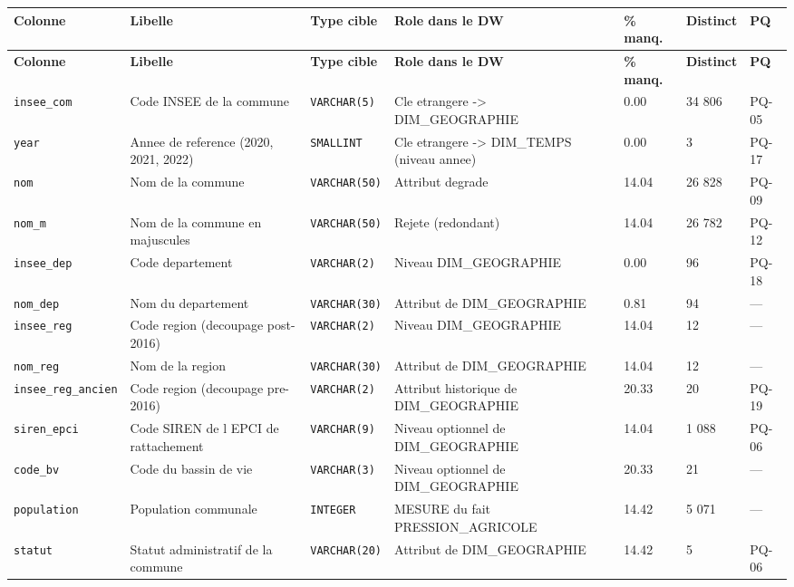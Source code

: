 {\footnotesize\setlength{\tabcolsep}{3pt}
\begin{longtable}{@{}p{2.6cm}p{3.5cm}p{1.9cm}p{3.1cm}p{1.1cm}p{1.3cm}p{0.9cm}@{}}
\toprule
\textbf{Colonne} & \textbf{Libelle} & \textbf{Type cible} & \textbf{Role dans le DW} & \textbf{\% manq.} & \textbf{Distinct} & \textbf{PQ} \\
\midrule \endfirsthead
\toprule \textbf{Colonne} & \textbf{Libelle} & \textbf{Type cible} & \textbf{Role dans le DW} & \textbf{\% manq.} & \textbf{Distinct} & \textbf{PQ} \\ \midrule \endhead
\bottomrule \endfoot
\texttt{insee\_com} & Code INSEE de la commune & \texttt{VARCHAR(5)} & Cle etrangere -> DIM\_GEOGRAPHIE & 0.00 & 34 806 & PQ-05 \\
\texttt{year} & Annee de reference (2020, 2021, 2022) & \texttt{SMALLINT} & Cle etrangere -> DIM\_TEMPS (niveau annee) & 0.00 & 3 & PQ-17 \\
\texttt{nom} & Nom de la commune & \texttt{VARCHAR(50)} & Attribut degrade & 14.04 & 26 828 & PQ-09 \\
\texttt{nom\_m} & Nom de la commune en majuscules & \texttt{VARCHAR(50)} & Rejete (redondant) & 14.04 & 26 782 & PQ-12 \\
\texttt{insee\_dep} & Code departement & \texttt{VARCHAR(2)} & Niveau DIM\_GEOGRAPHIE & 0.00 & 96 & PQ-18 \\
\texttt{nom\_dep} & Nom du departement & \texttt{VARCHAR(30)} & Attribut de DIM\_GEOGRAPHIE & 0.81 & 94 & --- \\
\texttt{insee\_reg} & Code region (decoupage post-2016) & \texttt{VARCHAR(2)} & Niveau DIM\_GEOGRAPHIE & 14.04 & 12 & --- \\
\texttt{nom\_reg} & Nom de la region & \texttt{VARCHAR(30)} & Attribut de DIM\_GEOGRAPHIE & 14.04 & 12 & --- \\
\texttt{insee\_reg\_ancien} & Code region (decoupage pre-2016) & \texttt{VARCHAR(2)} & Attribut historique de DIM\_GEOGRAPHIE & 20.33 & 20 & PQ-19 \\
\texttt{siren\_epci} & Code SIREN de l EPCI de rattachement & \texttt{VARCHAR(9)} & Niveau optionnel de DIM\_GEOGRAPHIE & 14.04 & 1 088 & PQ-06 \\
\texttt{code\_bv} & Code du bassin de vie & \texttt{VARCHAR(3)} & Niveau optionnel de DIM\_GEOGRAPHIE & 20.33 & 21 & --- \\
\texttt{population} & Population communale & \texttt{INTEGER} & MESURE du fait PRESSION\_AGRICOLE & 14.42 & 5 071 & --- \\
\texttt{statut} & Statut administratif de la commune & \texttt{VARCHAR(20)} & Attribut de DIM\_GEOGRAPHIE & 14.42 & 5 & PQ-06 \\

\end{longtable}}
